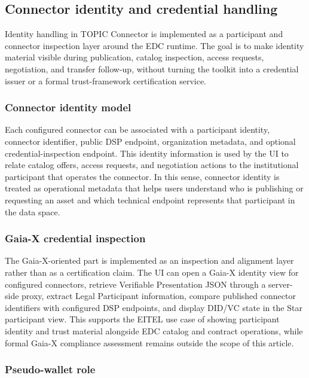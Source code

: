 \documentclass[a4paper,fleqn]{cas-dc}
\begin{document}
\subsection{Connector identity and credential handling}

Identity handling in TOPIC Connector is implemented as a participant and connector inspection layer around the EDC runtime. The goal is to make identity material visible during publication, catalog inspection, access requests, negotiation, and transfer follow-up, without turning the toolkit into a credential issuer or a formal trust-framework certification service.

\subsubsection{Connector identity model}

Each configured connector can be associated with a participant identity, connector identifier, public DSP endpoint, organization metadata, and optional credential-inspection endpoint. This identity information is used by the UI to relate catalog offers, access requests, and negotiation actions to the institutional participant that operates the connector. In this sense, connector identity is treated as operational metadata that helps users understand who is publishing or requesting an asset and which technical endpoint represents that participant in the data space.

\subsubsection{Gaia-X credential inspection}

The Gaia-X-oriented part is implemented as an inspection and alignment layer rather than as a certification claim. The UI can open a Gaia-X identity view for configured connectors, retrieve Verifiable Presentation JSON through a server-side proxy, extract Legal Participant information, compare published connector identifiers with configured DSP endpoints, and display DID/VC state in the Star participant view. This supports the EITEL use case of showing participant identity and trust material alongside EDC catalog and contract operations, while formal Gaia-X compliance assessment remains outside the scope of this article.

\subsubsection{Pseudo-wallet role}
\end{document}

